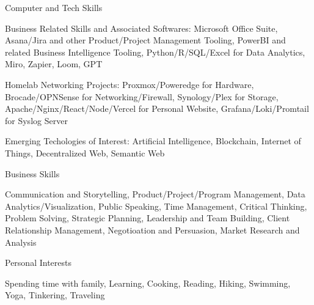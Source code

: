 

\begin{cventries}

  \cventry
    {Computer and Tech Skills} %
    {} %
    {} %
    {} %
    {
      \begin{cvitems} %
        \item {Business Related Skills and Associated Softwares: Microsoft Office Suite, Asana/Jira and other Product/Project Management Tooling, PowerBI and related Business Intelligence Tooling, Python/R/SQL/Excel for Data Analytics, Miro, Zapier, Loom, GPT}
        \item {Homelab Networking Projects: Proxmox/Poweredge for Hardware, Brocade/OPNSense for Networking/Firewall, Synology/Plex for Storage,  Apache/Nginx/React/Node/Vercel for Personal Website, Grafana/Loki/Promtail for Syslog Server}
        \item {Emerging Techologies of Interest: Artificial Intelligence, Blockchain, Internet of Things, Decentralized Web, Semantic Web}
      \end{cvitems}
    }

  \cventry
    {Business Skills} %
    {} %
    {} %
    {} %
    {
      \begin{cvitems} %
        \item {Communication and Storytelling, Product/Project/Program Management, Data Analytics/Visualization, Public Speaking, Time Management, Critical Thinking, Problem Solving, Strategic Planning, Leadership and Team Building, Client Relationship Management, Negotioation and Persuasion, Market Research and Analysis}
      \end{cvitems}
    }

  \cventry
    {Personal Interests} %
    {} %
    {} %
    {} %
    {
      \begin{cvitems} %
        \item {Spending time with family, Learning, Cooking, Reading, Hiking, Swimming, Yoga, Tinkering, Traveling}
      \end{cvitems}
    }

\end{cventries}
